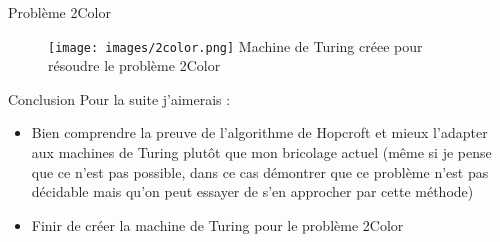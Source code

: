 \documentclass{beamer}
\begin{document}
    \begin{frame}{Problème 2Color}
        \begin{figure}
            \texttt{[image: images/2color.png]}
            Machine de Turing créee pour résoudre le problème 2Color
        \end{figure}
    \end{frame}
    \begin{frame}{Conclusion}
        Pour la suite j'aimerais :
        \begin{itemize}
            \item Bien comprendre la preuve de l'algorithme de Hopcroft et mieux 
            l'adapter aux machines de Turing plutôt que mon bricolage actuel (même 
            si je pense que ce n'est pas possible, dans ce cas démontrer que ce problème
            n'est pas décidable mais qu'on peut essayer de s'en approcher par cette méthode)
            \item Finir de créer la machine de Turing pour le problème 2Color 
        \end{itemize}
    \end{frame}
\end{document}
